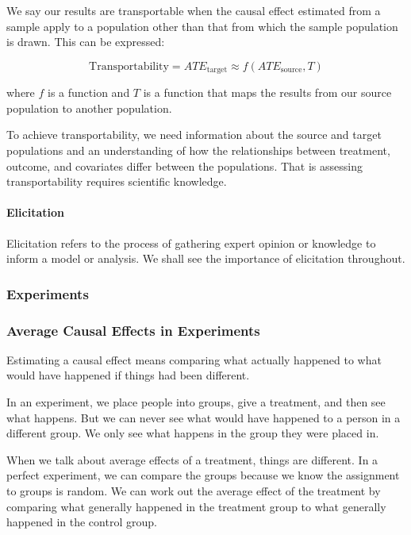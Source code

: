 \documentclass[
  singlecolumn]{article}
\let\oldparagraph\paragraph
\renewcommand{\paragraph}[1]{\oldparagraph{#1}\mbox{}}
\begin{document}
We say our results are transportable when the causal effect estimated
from a sample apply to a population other than that from which the
sample population is drawn. This can be expressed:

\[\text{Transportability} = ATE_{\text{target}} \approx f(ATE_{\text{source}}, T)\]

where \(f\) is a function and \(T\) is a function that maps the results
from our source population to another population.

To achieve transportability, we need information about the source and
target populations and an understanding of how the relationships between
treatment, outcome, and covariates differ between the populations. That
is assessing transportability requires scientific knowledge.

\paragraph{\texorpdfstring{\textbf{Elicitation}}{Elicitation}}\label{elicitation}

Elicitation refers to the process of gathering expert opinion or
knowledge to inform a model or analysis. We shall see the importance of
elicitation throughout.

\subsubsection{Experiments}\label{experiments}

\subsubsection{\texorpdfstring{\textbf{Average Causal Effects in
Experiments}}{Average Causal Effects in Experiments}}\label{average-causal-effects-in-experiments}

Estimating a causal effect means comparing what actually happened to
what would have happened if things had been different.

In an experiment, we place people into groups, give a treatment, and
then see what happens. But we can never see what would have happened to
a person in a different group. We only see what happens in the group
they were placed in.

When we talk about average effects of a treatment, things are different.
In a perfect experiment, we can compare the groups because we know the
assignment to groups is random. We can work out the average effect of
the treatment by comparing what generally happened in the treatment
group to what generally happened in the control group.
\end{document}
